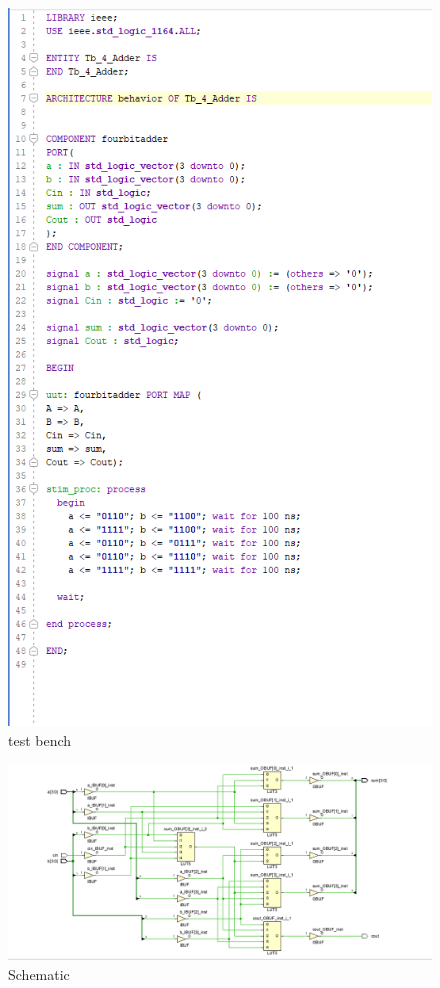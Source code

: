 \documentclass{article}
\begin{document}
\begin{figure}[h]
\begin{center}
\includegraphics[width=1\textwidth]{fourBitAdderTest.png} %
\caption{test bench}
\end{center}
\end{figure}

\begin{figure}[h]
\begin{center}
\includegraphics[width=1\textwidth]{fourBitAdderSchematic.png} %
\caption{Schematic}
\end{center}
\end{figure}
\end{document}
